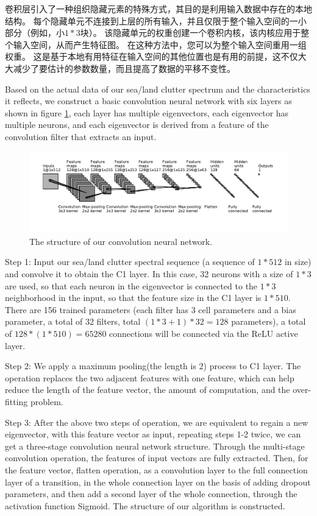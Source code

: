 卷积层引入了一种组织隐藏元素的特殊方式，其目的是利用输入数据中存在的本地结构。 每个隐藏单元不连接到上层的所有输入，并且仅限于整个输入空间的一小部分（例如，小$ 1 * 3 $块）。 该隐藏单元的权重创建一个卷积内核，该内核应用于整个输入空间，从而产生特征图。 在这种方法中，您可以为整个输入空间重用一组权重。 这是基于本地有用特征在输入空间的其他位置也是有用的前提，这不仅大大减少了要估计的参数数量，而且提高了数据的平移不变性。

Based on the actual data of our sea/land clutter spectrum and the characteristics it reflects, we construct a basic convolution neural network with six layers as shown in figure \ref{fig:struct}, each layer has multiple eigenvectors, each eigenvector has multiple neurons, and each eigenvector is derived from a feature of the convolution filter that extracts an input.
\begin{figure}[!t]
	\centering
	\includegraphics[width=7in]{figures/struct}
	\caption{The structure of our convolution neural network.}
	\label{fig:struct}
\end{figure}

Step 1: Input our sea/land clutter spectral sequence (a sequence of $1 * 512$ in size) and convolve it to obtain the C1 layer. In this case, 32 neurons with a size of $1 * 3$ are used, so that each neuron in the eigenvector is connected to the $1 * 3$ neighborhood in the input, so that the feature size in the C1 layer is $1 * 510$. There are 156 trained parameters (each filter has 3 cell parameters and a bias parameter, a total of 32 filters, total $(1 * 3 + 1) * 32 = 128$ parameters), a total of $128 * (1 * 510) = 65280$ connections will be connected via the ReLU active layer.

Step 2: We apply a maximum pooling(the length is 2) process to C1 layer. The operation replaces the two adjacent features with one feature, which can help reduce the length of the feature vector, the amount of computation, and the over-fitting problem.

Step 3: After the above two steps of operation, we are equivalent to regain a new eigenvector, with this feature vector as input, repeating steps 1-2 twice, we can get a three-stage convolution neural network structure. Through the multi-stage convolution operation, the features of input vectors are fully extracted. Then, for the feature vector, flatten operation, as a convolution layer to the full connection layer of a transition, in the whole connection layer on the basis of adding dropout parameters, and then add a second layer of the whole connection, through the activation function Sigmoid. The structure of our algorithm is constructed.

